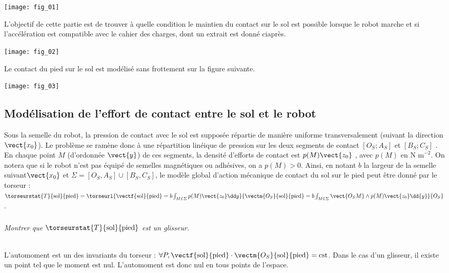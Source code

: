 \begin{multicols}{2}
\begin{center}
\texttt{[image: fig\_01]}
\end{center}
\fi
\begin{obj}
L’objectif de cette partie est de trouver à quelle condition le maintien du contact sur le sol est possible lorsque
le robot marche et si l'accélération est compatible avec le cahier des charges, dont un extrait est donné ciaprès.
\end{obj}

\begin{center}
\texttt{[image: fig\_02]}
\end{center}


\ifprof
\else

Le contact du pied sur le sol est modélisé sans frottement sur la figure suivante.


\begin{center}
\texttt{[image: fig\_03]}
\end{center}
\fi

\subsection*{Modélisation de l’effort de contact entre le sol et le robot}

\ifprof
\else

Sous la semelle du robot, la pression de contact avec le sol est supposée répartie de manière uniforme
transversalement (suivant la direction $\vect{x_0}$). Le problème se ramène donc à une répartition linéique de pression
sur les deux segments de contact $[O_S ;A_S]$ et $[B_S;C_S]$ . En chaque point $M$ (d'ordonnée $\vect{y}$) de ces
segments, la densité d'efforts de contact est $p(M)\vect{z_0}$ , avec $p(M)$ en $\text{N m}^{-2}$. On notera que si le robot n'est pas équipé de semelles magnétiques ou adhésives, on a $p(M)> 0$. Ainsi, en notant $b$ la largeur de la semelle
suivant$\vect{x_0}$ et $\Sigma=[O_S ,A_S]\cup [B_S,C_S]$, le modèle global d'action mécanique de contact du sol sur le pied peut être donné par le torseur :
$
\torseurstat{T}{\text{sol}}{\text{pied}}=\torseurl{\vectf{\text{sol}}{\text{pied}}=b\int_{M\in\Sigma} p(M)\vect{z_0} \dd y }{\vectm{O_S}{\text{sol}}{\text{pied}}=b\int_{M\in\Sigma} \vect{O_S M} \wedge p(M)\vect{z_0} \dd {y}}{O_S}$.

\fi

\subparagraph{} \textit{Montrer que $\torseurstat{T}{\text{sol}}{\text{pied}}$ est un glisseur.}
\ifprof
\begin{corrige}~\\
L'automoment est un des invariants du torseur : $\forall P, \vectf{\text{sol}}{\text{pied}}\cdot\vectm{O_S}{\text{sol}}{\text{pied}}=\text{cst}$. Dans le cas d'un glisseur, il existe un point tel que le moment est nul. L'automoment est donc nul en tous points de l'espace.


\end{corrige}
\end{multicols}
